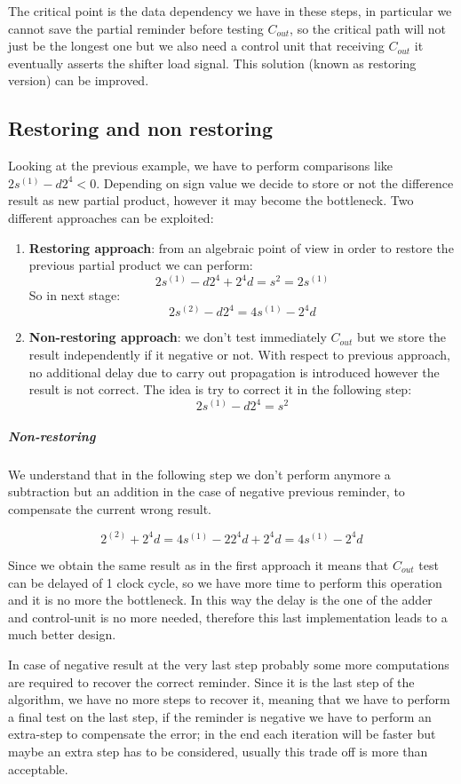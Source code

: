 The critical point is the data dependency we have in these steps, in particular we cannot save the partial reminder before testing $C_{out}$, so the critical path will not just be the longest one but we also need a control unit that receiving $C_{out}$ it eventually asserts the shifter load signal. This solution (known as restoring version) can be improved.

\subsection{Restoring and non restoring}

Looking at the previous example, we have to perform comparisons like
$2s^{(1)}-d2^4 <0$. Depending on sign value we decide to store or not the difference result as new partial product, however it may become the bottleneck. Two different approaches can be exploited:

\begin{enumerate}
  \item \textbf{Restoring approach}: from an algebraic point of view in order to restore the previous partial product we can perform:
  $$ 2s^{(1)}-d2^4+2^4d=s^{2}=2s^{(1)}$$
  So in next stage:
  $$ 2s^{(2)}-d2^4=4s^{(1)}-2^4 d$$

  \item \textbf{Non-restoring approach}: we don't test immediately $C_{out}$ but we store the result independently if it negative or not. With respect to previous approach, no additional delay due to carry out propagation is introduced however the result is not correct. The idea is try to correct it in the following step:
  $$2s^{(1)}-d2^4=s^{2}$$
\end{enumerate}

\subparagraph{Non-restoring}
We understand that in the following step we don't perform anymore a subtraction but an addition in the case of negative previous reminder, to compensate the current wrong result.

$$2^{(2)}+2^4 d=4s^{(1)}-2 2^4 d + 2^4 d = 4s^{(1)} -2^4d$$

Since we obtain the same result as in the first approach it means that $C_{out}$ test can be delayed of 1 clock cycle, so we have more time to perform this operation and it is no more the bottleneck. In this way the delay is the one of the adder and control-unit is no more needed, therefore this last implementation leads to a much better design.

In case of negative result at the very last step probably some more computations are required to recover the correct reminder. Since it is the last step of the algorithm, we have no more steps to recover it, meaning that we have to perform a final test on the last step, if the reminder is negative we have to perform an extra-step to compensate the error; in the end each iteration will be faster but maybe an extra step has to be considered, usually this trade off is more than acceptable.

